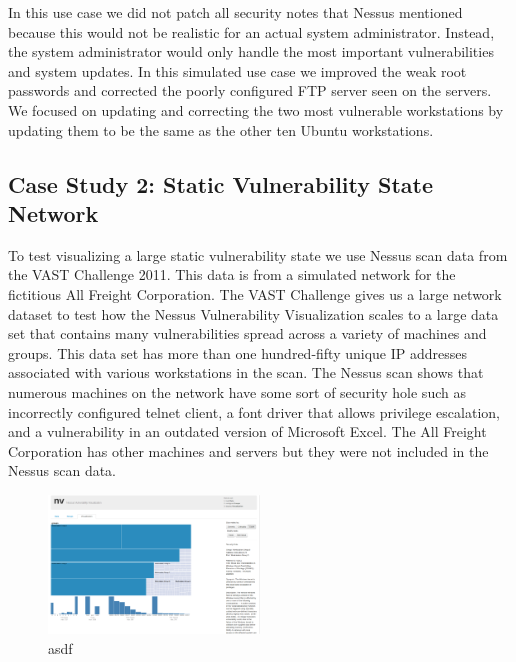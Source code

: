\documentclass{acm_proc_article-sp}
\begin{document}
In this use case we did not patch all security notes that Nessus mentioned
because this would not be realistic for an actual system administrator. Instead,
the system administrator would only handle the most important vulnerabilities and
system updates. In this simulated use case we improved the weak root passwords
and corrected the poorly configured FTP server seen on the servers. We focused on updating
and correcting the two most vulnerable workstations by updating them to be the
same as the other ten Ubuntu workstations.



\subsection{Case Study 2: Static Vulnerability State Network }
To test visualizing a large static vulnerability state we use Nessus scan data from
the VAST Challenge 2011\cite{VAST2011}. This data is from a simulated network for the
fictitious All Freight Corporation. The VAST Challenge gives us a large network
dataset to test how the Nessus Vulnerability Visualization scales to a large
data set that contains many vulnerabilities spread across a variety of machines and
groups. This data set has more than one
hundred-fifty unique IP addresses associated with various workstations in the
scan. The Nessus scan shows that numerous
machines on the network have some sort of security hole such as incorrectly
configured telnet client, a font driver that allows privilege escalation, and a
vulnerability in an outdated version of Microsoft Excel. The All Freight
Corporation has other machines and servers but they were not included in the
Nessus scan data.

\begin{figure}
  \centering
  \includegraphics[width=0.5\textwidth]{../screenshots/final/VastGroup}
  \caption{asdf}
\end{figure}
\end{document}
